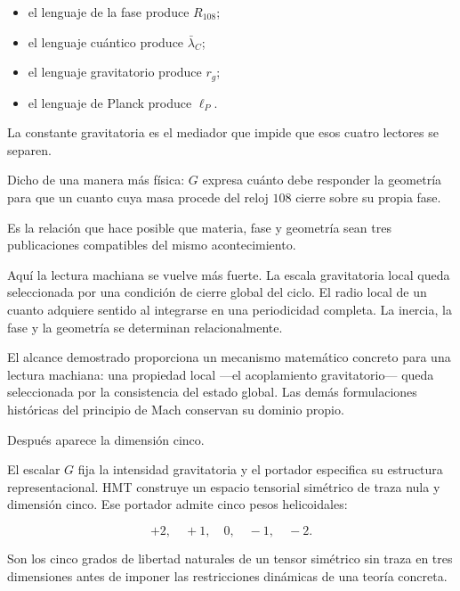 \begin{itemize}[leftmargin=*,itemsep=0.35em]
\item el lenguaje de la fase produce \(R_{108}\);
\item el lenguaje cuántico produce \(\bar\lambda_C\);
\item el lenguaje gravitatorio produce \(r_g\);
\item el lenguaje de Planck produce \(\ell_P\).
\end{itemize}

La constante gravitatoria es el mediador que impide que esos cuatro lectores se separen.\par

Dicho de una manera más física: \(G\) expresa cuánto debe responder la geometría para que un cuanto cuya masa procede del reloj \(108\) cierre sobre su propia fase.\par

Es la relación que hace posible que materia, fase y geometría sean tres publicaciones compatibles del mismo acontecimiento.\par

Aquí la lectura machiana se vuelve más fuerte. La escala gravitatoria local queda seleccionada por una condición de cierre global del ciclo. El radio local de un cuanto adquiere sentido al integrarse en una periodicidad completa. La inercia, la fase y la geometría se determinan relacionalmente.\par

El alcance demostrado proporciona un mecanismo matemático concreto para una lectura machiana: una propiedad local —el acoplamiento gravitatorio— queda seleccionada por la consistencia del estado global. Las demás formulaciones históricas del principio de Mach conservan su dominio propio.\par

Después aparece la dimensión cinco.\par

El escalar \(G\) fija la intensidad gravitatoria y el portador especifica su estructura representacional. HMT construye un espacio tensorial simétrico de traza nula y dimensión cinco. Ese portador admite cinco pesos helicoidales:\par

\[
+2,\quad +1,\quad 0,\quad -1,\quad -2.
\]

Son los cinco grados de libertad naturales de un tensor simétrico sin traza en tres dimensiones antes de imponer las restricciones dinámicas de una teoría concreta.\par

